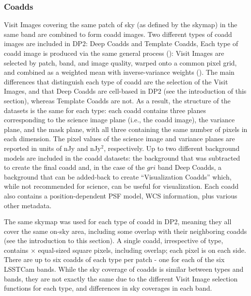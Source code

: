 \subsubsection{Coadds}
\label{sssec:coadds}
Visit Images covering the same \gls{patch} of sky (as defined by the skymap) in the same band are combined to form coadd images.
Two different types of coadd images are included in DP2: Deep Coadds and Template Coadds,
Each type of coadd image is produced via the same general process ():  Visit Images are selected by \gls{patch}, band, and image quality, warped onto a common pixel grid, and combined as a weighted mean with inverse-variance weights ().
The main differences that distinguish each type of coadd are the selection of the \glspl{Visit Image}, and that Deep Coadds are cell-based in DP2 (see the introduction of this section), whereas Template Coadds are not.
As a result, the structure of the datasets is the same for each type: each coadd contains three planes corresponding to the science image plane (i.e., the coadd image), the variance plane, and the mask plane, with all three containing the same number of pixels in each dimension.
The pixel values of the science image and variance planes are reported in units of nJy and nJy$^2$, respectively.
Up to two different \gls{background} models are included in the coadd datasets: the \gls{background} that was subtracted to create the final coadd and, in the case of the $gri$ band Deep Coadds, a \gls{background} that can be added-back to create ``Visualization Coadds'' which, while not recommended for science, can be useful for visualization.
Each coadd also contains a position-dependent \gls{PSF} model, WCS information, plus various other metadata.



The same skymap was used for each type of coadd in DP2, meaning they all cover the same on-sky area, including some overlap with their neighboring coadds (see the introduction to this section).
A single coadd, irrespective of type, contains \npatchpixx $\times$ \npatchpixy equal-sized square pixels, including overlap; each pixel is \coaddpixsize on each side.
There are up to six coadds of each type per \gls{patch} - one for each of the six LSSTCam bands.
While the sky coverage of coadds is similar between types and bands, they are not exactly the same due to the different \gls{Visit Image} selection functions for each type, and differences in sky coverages in each band.

